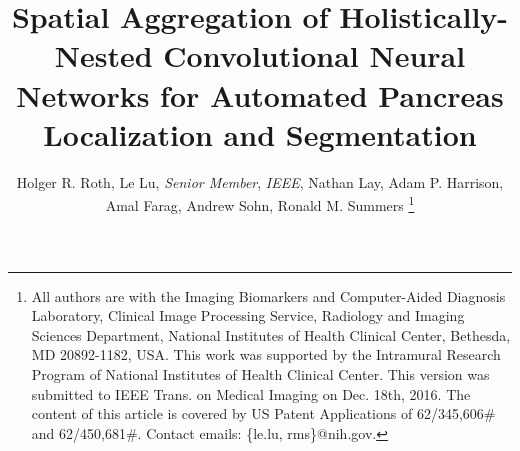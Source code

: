 \documentclass[journal]{IEEEtran}
\begin{document}
%
\title{Spatial Aggregation of Holistically-Nested Convolutional Neural Networks for Automated Pancreas Localization and Segmentation} 
%
\author{Holger R. Roth, Le Lu, {\em Senior Member}, {\em IEEE}, Nathan Lay, Adam P. Harrison, Amal Farag, Andrew Sohn, Ronald M. Summers
\thanks{All authors are with the Imaging Biomarkers and Computer-Aided Diagnosis Laboratory, Clinical Image Processing Service, Radiology and Imaging Sciences Department, National Institutes of Health Clinical Center, Bethesda, MD 20892-1182, USA. This work was supported by the Intramural Research Program of National Institutes of Health Clinical Center. This version was submitted to IEEE Trans. on Medical Imaging on Dec. 18th, 2016. The content of this article is covered by US Patent Applications of 62/345,606\# and 62/450,681\#. Contact emails: \{le.lu, rms\}@nih.gov.
}%
} %
\maketitle
\end{document}
